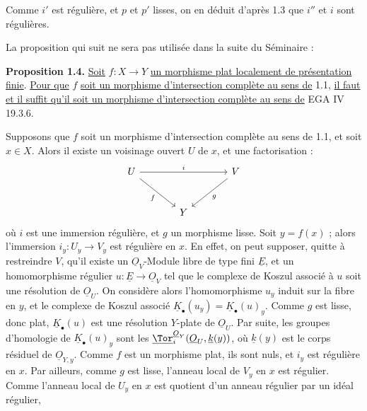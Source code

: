 
Comme $i'$ est régulière, et $p$ et $p'$ lisses, on en déduit d'après 1.3 que $i''$ et $i$ sont régulières.

La proposition qui suit ne sera pas utilisée dans la suite du Séminaire :

\textbf{Proposition 1.4.} \uline{Soit} $f:X\to Y$ \uline{un morphisme plat localement de présentation finie}. \uline{Pour que} $f$ \uline{soit un morphisme d'intersection complète au sens de} 1.1, \uline{il faut et il suffit qu'il soit un morphisme d'intersection complète au sens de} EGA IV 19.3.6.

Supposons que $f$ soit un morphisme d'intersection complète au sens de 1.1, et soit $x\in X$. Alors il existe un voisinage ouvert $U$ de $x$, et une factorisation :
\[
\begin{tikzcd}[column sep=large,row sep=large]
U \arrow[rr,"i"] \arrow[dr,"f"'] && V \arrow[dl,"g"]\\
& Y &
\end{tikzcd}
\]
où $i$ est une immersion régulière, et $g$ un morphisme lisse. Soit $y=f(x)$ ; alors l'immersion $i_y:U_y\to V_y$ est régulière en $x$. En effet, on peut supposer, quitte à restreindre $V$, qu'il existe un $\underline{O}_V$-Module libre de type fini $\underline{E}$, et un homomorphisme régulier $u:\underline{E}\to\underline{O}_V$ tel que le complexe de Koszul associé à $u$ soit une résolution de $\underline{O}_U$. On considère alors l'homomorphisme $u_y$ induit sur la fibre en $y$, et le complexe de Koszul associé $\underline{K}_\bullet(u_y)=\underline{K}_\bullet(u)_y$. Comme $g$ est lisse, donc plat, $\underline{K}_\bullet(u)$ est une résolution $Y$-plate de $\underline{O}_U$. Par suite, les groupes d'homologie de $\underline{K}_\bullet(u)_y$ sont les $\underline{\Tor}_i^{\underline{O}_Y}(\underline{O}_U,\underline{k}(y))$, où $\underline{k}(y)$ est le corps résiduel de $\underline{O}_{Y,y}$. Comme $f$ est un morphisme plat, ils sont nuls, et $i_y$ est régulière en $x$. Par ailleurs, comme $g$ est lisse, l'anneau local de $V_y$ en $x$ est régulier. Comme l'anneau local de $U_y$ en $x$ est quotient d'un anneau régulier par un idéal régulier,
